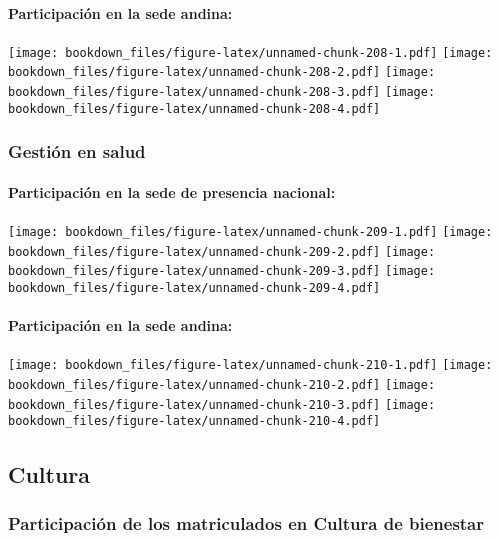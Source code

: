\documentclass[]{article}
\let\oldparagraph\paragraph
\renewcommand{\paragraph}[1]{\oldparagraph{#1}\mbox{}}
\theoremstyle{definition}
\theoremstyle{definition}
\theoremstyle{definition}
\theoremstyle{remark}
\begin{document}
\paragraph{Participación en la sede
andina:}\label{participacion-en-la-sede-andina-20}

\texttt{[image: bookdown\_files/figure-latex/unnamed-chunk-208-1.pdf]}
\texttt{[image: bookdown\_files/figure-latex/unnamed-chunk-208-2.pdf]}
\texttt{[image: bookdown\_files/figure-latex/unnamed-chunk-208-3.pdf]}
\texttt{[image: bookdown\_files/figure-latex/unnamed-chunk-208-4.pdf]}

\subsubsection{Gestión en salud}\label{gestion-en-salud-1}

\paragraph{Participación en la sede de presencia
nacional:}\label{participacion-en-la-sede-de-presencia-nacional-21}

\texttt{[image: bookdown\_files/figure-latex/unnamed-chunk-209-1.pdf]}
\texttt{[image: bookdown\_files/figure-latex/unnamed-chunk-209-2.pdf]}
\texttt{[image: bookdown\_files/figure-latex/unnamed-chunk-209-3.pdf]}
\texttt{[image: bookdown\_files/figure-latex/unnamed-chunk-209-4.pdf]}

\paragraph{Participación en la sede
andina:}\label{participacion-en-la-sede-andina-21}

\texttt{[image: bookdown\_files/figure-latex/unnamed-chunk-210-1.pdf]}
\texttt{[image: bookdown\_files/figure-latex/unnamed-chunk-210-2.pdf]}
\texttt{[image: bookdown\_files/figure-latex/unnamed-chunk-210-3.pdf]}
\texttt{[image: bookdown\_files/figure-latex/unnamed-chunk-210-4.pdf]}

\subsection{Cultura}\label{cultura-1}

\subsubsection{Participación de los matriculados en Cultura de
bienestar}\label{participacion-de-los-matriculados-en-cultura-de-bienestar-1}
\end{document}
